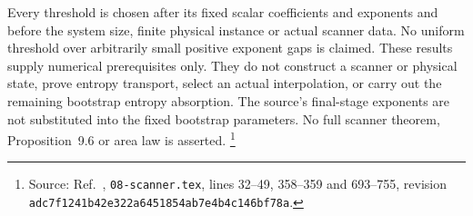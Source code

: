 \documentclass{article}
\begin{document}
Every threshold is chosen after its fixed scalar coefficients and
exponents and before the system size, finite physical instance or
actual scanner data.
No uniform threshold over arbitrarily small positive exponent gaps is
claimed.
These results supply numerical prerequisites only.
They do not construct a scanner or physical state, prove entropy
transport, select an actual interpolation, or carry out the remaining
bootstrap entropy absorption.
The source's final-stage exponents are not substituted into the fixed
bootstrap parameters.
No full scanner theorem, Proposition~9.6 or area law is asserted.
\footnote{Source: Ref.~\cite{OpenAI2026AreaLaw},
    \texttt{08-scanner.tex}, lines 32--49, 358--359 and 693--755,
    revision \texttt{adc7f1241b42e322a6451854ab7e4b4c146bf78a}.}



\end{document}
